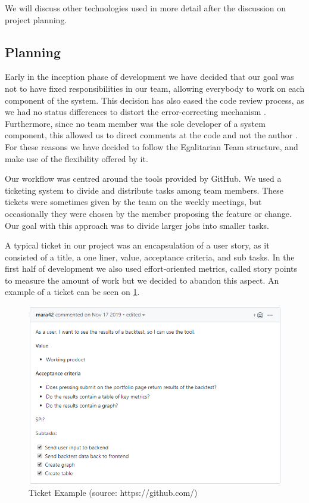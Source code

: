 \documentclass[main.tex]{subfiles}
\begin{document}
We will discuss other technologies used in more detail after the discussion on project planning.

\subsection{Planning}

Early in the inception phase of development we have decided that our goal was not to have fixed responsibilities in our team, allowing everybody to work on each component of the system. This decision has also eased the code review process, as we had no status differences to distort the error-correcting mechanism \cite{statusdifference}. Furthermore, since no team member was the sole developer of a system component, this allowed us to direct comments at the code and not the author \cite{howtoreview}. For these reasons we have decided to follow the Egalitarian Team structure, and make use of the flexibility offered by it.

Our workflow was centred around the tools provided by GitHub. We used a ticketing system to divide and distribute tasks among team members. These tickets were sometimes given by the team on the weekly meetings, but occasionally they were chosen by the member proposing the feature or change. Our goal with this approach was to divide larger jobs into smaller tasks.

A typical ticket in our project was an encapsulation of a user story, as it consisted of a title, a one liner, value, acceptance criteria, and sub tasks. In the first half of development we also used effort-oriented metrics, called story points to measure the amount of work but we decided to abandon this aspect. An example of a ticket can be seen on \figurename{\ref{Ticket}}.

\begin{figure}[H]
   \centering
   \includegraphics[scale=0.7]{05Coding/05Pictures/ticket.png}
   \caption{Ticket Example (source: https://github.com/)}
   \label{Ticket}
\end{figure}
\end{document}

